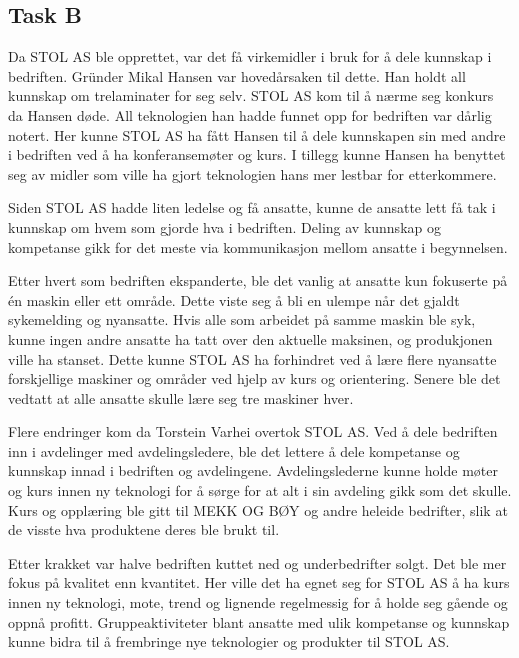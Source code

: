 \subsection{Task B}
Da STOL AS ble opprettet, var det få virkemidler i bruk for å dele kunnskap i bedriften. 
Gründer Mikal Hansen var hovedårsaken til dette.
Han holdt all kunnskap om trelaminater for seg selv. STOL AS kom til å nærme seg konkurs da Hansen døde.
All teknologien han hadde funnet opp for bedriften var dårlig notert. 
Her kunne STOL AS ha fått Hansen til å dele kunnskapen sin med andre i bedriften ved å ha konferansemøter og kurs. I tillegg kunne Hansen ha benyttet seg av midler som ville ha gjort teknologien hans mer lestbar for etterkommere.

Siden STOL AS hadde liten ledelse og få ansatte, kunne de ansatte lett få tak i kunnskap om hvem som gjorde hva i bedriften. Deling av kunnskap og kompetanse gikk for det meste via kommunikasjon mellom ansatte i begynnelsen.

Etter hvert som bedriften ekspanderte, ble det vanlig at ansatte kun fokuserte på én maskin eller ett område.
Dette viste seg å bli en ulempe når det gjaldt sykemelding og nyansatte. 
Hvis alle som arbeidet på samme maskin ble syk, kunne ingen andre ansatte ha tatt over den aktuelle maksinen, og produkjonen ville ha stanset.
Dette kunne STOL AS ha forhindret ved å lære flere nyansatte forskjellige maskiner og områder ved hjelp av kurs og orientering.
Senere ble det vedtatt at alle ansatte skulle lære seg tre maskiner hver.

Flere endringer kom da Torstein Varhei overtok STOL AS.
Ved å dele bedriften inn i avdelinger med avdelingsledere, ble det lettere å dele kompetanse og kunnskap innad i bedriften og avdelingene.
Avdelingslederne kunne holde møter og kurs innen ny teknologi for å sørge for at alt i sin avdeling gikk som det skulle.
Kurs og opplæring ble gitt til MEKK OG BØY og andre heleide bedrifter, slik at de visste hva produktene deres ble brukt til.

Etter krakket var halve bedriften kuttet ned og underbedrifter solgt. Det ble mer fokus på kvalitet enn kvantitet.
Her ville det ha egnet seg for STOL AS å ha kurs innen ny teknologi, mote, trend og lignende regelmessig for å holde seg gående og oppnå profitt.
Gruppeaktiviteter blant ansatte med ulik kompetanse og kunnskap kunne bidra til å frembringe nye teknologier og produkter til STOL AS.
